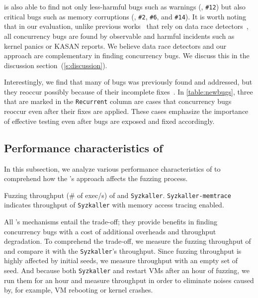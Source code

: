\sys is also able to find not only less-harmful bugs such as warnings
(\eg, \texttt{\#12}) but also critical bugs such as memory corruptions
(\eg, \texttt{\#2}, \texttt{\#6}, and \texttt{\#14}).
%
It is worth noting that in our evaluation, unlike previous
works~\cite{snowboard, krace} that rely on data race
detectors~\cite{kcsan, tsan}, all concurrency bugs are found by
observable and harmful incidents such as kernel panics or KASAN
reports.
%
\dr{}
We believe data race detectors and our approach are complementary in
finding concurrency bugs. We discuss this in the discussion
section~(\autoref{s:discussion}).

Interestingly, we find that many of bugs was previously found and
addressed, but they reoccur possibly because of their incomplete
fixes~\cite{learningfrommistakes}.
%
In \autoref{table:newbugs}, three that are marked in the
\texttt{Recurrent} column are cases that concurrency bugs reoccur even
after their fixes are applied.
%
These cases emphasize the importance of effective testing even after
bugs are exposed and fixed accordingly.






\subsection{Performance characteristics of \sys}
\label{ss:characteristics}

In this subsection, we analyze various performance characteristics of
\sys to comprehend how the \sys's approach affects the fuzzing
process.



%
\begin{table}[t]
  \small
  \centering
  
  \caption{Fuzzing throughput (\# of exec/s) of \sys and
    \texttt{Syzkaller}. \texttt{Syzkaller-memtrace} indicates
    throughput of \texttt{Syzkaller} with memory access tracing
    enabled.}
  \label{table:throughput}
\end{table}
%
All \sys's mechanisms entail the trade-off; they provide benefits in
finding concurrency bugs with a cost of additional overheads and
throughput degradation.
%
To comprehend the trade-off, we measure the fuzzing throughput of \sys
and compare it with the \texttt{Syzkaller}'s throughput.
%
Since fuzzing throughput is highly affected by initial seeds, we
measure throughput with an empty set of seed. And because both
\texttt{Syzkaller} and \sys restart VMs after an hour of fuzzing, we
run them for an hour and measure throughput in order to eliminate
noises caused by, for example, VM rebooting or kernel crashes.

